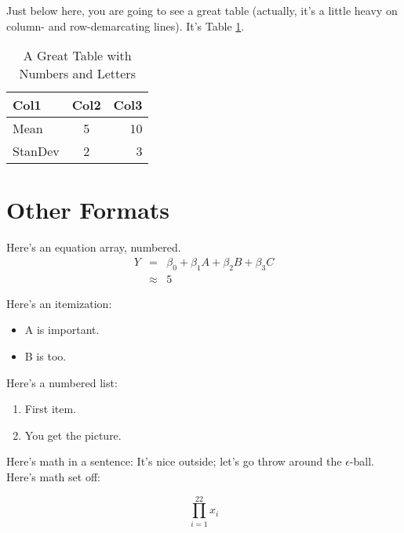 \documentclass[12pt]{article}
\begin{document}
Just below here, you are going to see a great table (actually, it's a little heavy on column- and row-demarcating lines).  It's Table \ref{table:t1}.

\bigskip

\begin{table}[h!]
\footnotesize
\begin{center}
\begin{tabular}{|l||c|r|} \hline
Col1 & Col2 	& Col3 \\ \hline
Mean & 5	& 10	\\
StanDev &  2	& 3 \\ \hline
\end{tabular}
\end{center}
\caption{A Great Table with Numbers and Letters}
\label{table:t1}
\end{table}

\clearpage

\section{Other Formats}

Here's an equation array, numbered.
\begin{eqnarray}
Y & = & \beta_0 + \beta_1 A + \beta_2 B + \beta_3 C \\
& \approx & 5 
\end{eqnarray}

Here's an itemization:
\begin{singlespacing}
\begin{itemize}
\item A is important.
\item B is too.
\end{itemize}
\end{singlespacing}

Here's a numbered list:

\begin{singlespacing}
\begin{enumerate}
\item First item.
\item You get the picture.
\end{enumerate}
\end{singlespacing}

Here's math in a sentence:  It's nice outside; let's go throw around the $\epsilon$-ball.  Here's math set off:

\begin{displaymath}
\prod_{i=1}^{22} x_i
\end{displaymath}
\end{document}
